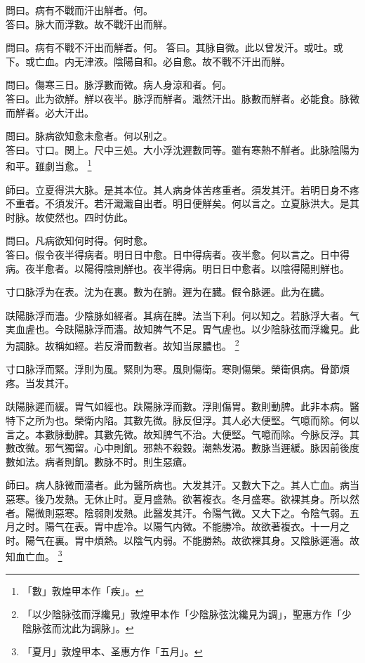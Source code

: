 \documentclass[12pt,twoside,UTF8,b5paper]{ctexbook}
\begin{document}
問曰。病有不戰而汗出觧者。何。\\
答曰。脉大而浮數。故不戰汗出而觧。

問曰。病有不戰不汗出而觧者。何。
答曰。其脉自微。此以曾发汗。或吐。或下。或亡血。内无津液。陰陽自和。必自愈。故不戰不汗出而觧。

問曰。傷寒三日。脉浮數而微。病人身涼和者。何。\\
答曰。此为欲觧。觧以夜半。脉浮而觧者。濈然汗出。脉數而觧者。必能食。脉微而觧者。必大汗出。

問曰。脉病欲知愈未愈者。何以别之。\\
答曰。寸口。関上。尺中三処。大小浮沈遲數同等。雖有寒熱不觧者。此脉陰陽为和平。雖劇当愈。
	\footnote{「數」敦煌甲本作「疾」。}

師曰。立夏得洪大脉。是其本位。其人病身体苦疼重者。須发其汗。若明日身不疼不重者。不須发汗。若汗濈濈自出者。明日便觧矣。何以言之。立夏脉洪大。是其时脉。故使然也。四时仿此。

問曰。凡病欲知何时得。何时愈。\\
答曰。假令夜半得病者。明日日中愈。日中得病者。夜半愈。何以言之。日中得病。夜半愈者。以陽得陰則觧也。夜半得病。明日日中愈者。以陰得陽則觧也。

寸口脉浮为在表。沈为在裏。數为在腑。遲为在臓。假令脉遲。此为在臓。

趺陽脉浮而濇。少陰脉如經者。其病在脾。法当下利。何以知之。若脉浮大者。气実血虗也。今趺陽脉浮而濇。故知脾气不足。胃气虗也。以少陰脉弦而浮纔見。此为調脉。故稱如經。若反滑而數者。故知当尿膿也。
	\footnote{「以少陰脉弦而浮纔見」敦煌甲本作「少陰脉弦沈纔見为調」，聖惠方作「少陰脉弦而沈此为調脉」。}

寸口脉浮而緊。浮則为風。緊則为寒。風則傷衛。寒則傷榮。榮衛俱病。骨節煩疼。当发其汗。

趺陽脉遲而緩。胃气如經也。趺陽脉浮而數。浮則傷胃。數則動脾。此非本病。醫特下之所为也。榮衛内陷。其數先微。脉反但浮。其人必大便堅。气噫而除。何以言之。本數脉動脾。其數先微。故知脾气不治。大便堅。气噫而除。今脉反浮。其數改微。邪气獨留。心中則飢。邪熱不殺穀。潮熱发渴。數脉当遲緩。脉因前後度數如法。病者則飢。數脉不时。則生惡瘡。

師曰。病人脉微而濇者。此为醫所病也。大发其汗。又數大下之。其人亡血。病当惡寒。後乃发熱。无休止时。夏月盛熱。欲著複衣。冬月盛寒。欲裸其身。所以然者。陽微則惡寒。陰弱則发熱。此醫发其汗。令陽气微。又大下之。令陰气弱。五月之时。陽气在表。胃中虗冷。以陽气内微。不能勝冷。故欲著複衣。十一月之时。陽气在裏。胃中煩熱。以陰气内弱。不能勝熱。故欲裸其身。又陰脉遲濇。故知血亡血。
	\footnote{「夏月」敦煌甲本、圣惠方作「五月」。}
\end{document}
